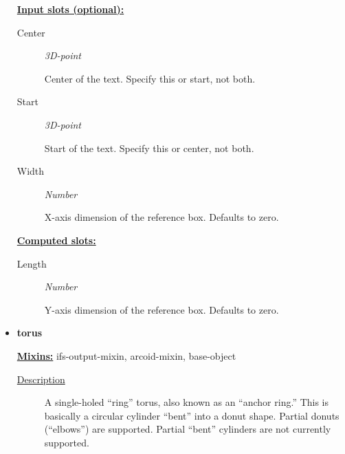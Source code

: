\documentclass [11pt]{book}
\begin{document}
\begin{itemize}
\textbf{
\underline{Input slots (optional):}}

\begin{description}

\item [Center]
\emph{3D-point}

 Center of the text. Specify this or start, not both.




\item [Start]
\emph{3D-point}

 Start of the text. Specify this or center, not both.




\item [Width]
\emph{Number}

 X-axis dimension of the reference box. Defaults to zero.




\end{description}






\textbf{
\underline{Computed slots:}}

\begin{description}

\item [Length]
\emph{Number}

 Y-axis dimension of the reference box. Defaults to zero.




\end{description}







\item {}
\label{prim:torus}
\textbf{torus}


\textbf{
\underline{Mixins:}} ifs-output-mixin, arcoid-mixin, base-object





\begin{description}

\item [
\underline{Description}]


A single-holed ``ring'' torus, also known as an ``anchor ring.''
This is basically a circular cylinder ``bent'' into a donut shape. Partial donuts (``elbows'') are supported.
Partial ``bent'' cylinders are not currently supported.




\end{description}
\end{itemize}
\end{document}
